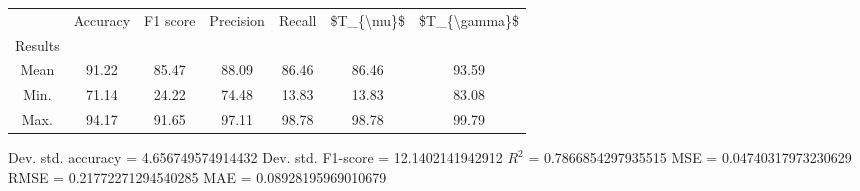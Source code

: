 \begin{tabular}{|c|c|c|c|c|c|c|}
\toprule
{} &  Accuracy &  F1 score &  Precision &  Recall &  \$T\_\{\textbackslash mu\}\$ &  \$T\_\{\textbackslash gamma\}\$ \\
Results &           &           &            &         &            &               \\
\hline
Mean    &     91.22 &     85.47 &      88.09 &   86.46 &      86.46 &         93.59 \\
Min.    &     71.14 &     24.22 &      74.48 &   13.83 &      13.83 &         83.08 \\
Max.    &     94.17 &     91.65 &      97.11 &   98.78 &      98.78 &         99.79 \\
\bottomrule
\end{tabular}

 Dev. std. accuracy = 4.656749574914432
 Dev. std. F1-score = 12.1402141942912
 $R^2$ = 0.7866854297935515
 MSE = 0.04740317973230629
 RMSE = 0.21772271294540285
 MAE = 0.08928195969010679
